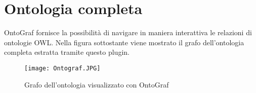 \chapter{Ontologia completa}
OntoGraf fornisce la possibilità di navigare in maniera interattiva le relazioni di ontologie OWL. Nella figura sottostante viene mostrato il grafo dell'ontologia completa estratta tramite questo plugin.
\begin{figure}[h]
	\centering
	\texttt{[image: Ontograf.JPG]}
	\caption{Grafo dell'ontologia visualizzato con OntoGraf}
\end{figure}